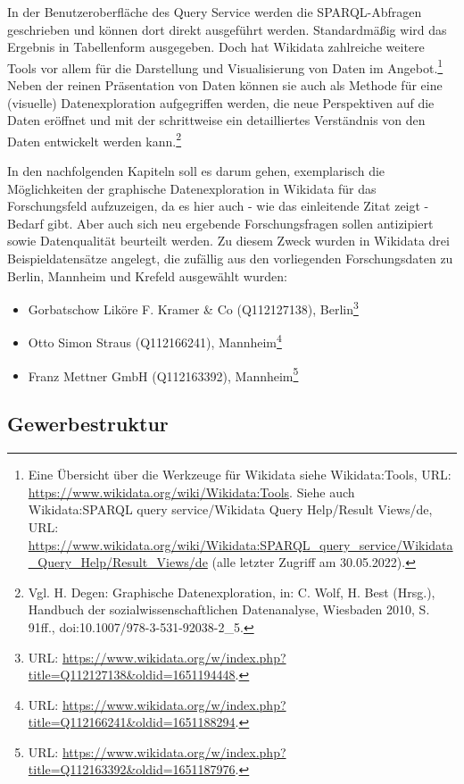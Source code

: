 In der Benutzeroberfläche des Query Service werden die SPARQL-Abfragen geschrieben und können dort direkt ausgeführt werden. Standardmäßig wird das Ergebnis in Tabellenform ausgegeben. Doch hat Wikidata zahlreiche weitere Tools vor allem für die Darstellung und Visualisierung von Daten im Angebot.\footnote{Eine Übersicht über die Werkzeuge für Wikidata siehe Wikidata:Tools, URL: \url{https://www.wikidata.org/wiki/Wikidata:Tools}. Siehe auch Wikidata:SPARQL query service/Wikidata Query Help/Result Views/de, URL: \url{https://www.wikidata.org/wiki/Wikidata:SPARQL_query_service/Wikidata_Query_Help/Result_Views/de} (alle letzter Zugriff am 30.05.2022).} Neben der reinen Präsentation von Daten können sie auch als Methode für eine (visuelle) Datenexploration aufgegriffen werden, die neue Perspektiven auf die Daten eröffnet und mit der schrittweise ein detailliertes Verständnis von den Daten entwickelt werden kann.\footnote{Vgl. H. Degen: Graphische Datenexploration, in: C. Wolf, H. Best (Hrsg.), Handbuch der sozialwissenschaftlichen Datenanalyse, Wiesbaden 2010, S. 91ff., doi:10.1007/978-3-531-92038-2\_5.} 

In den nachfolgenden Kapiteln soll es darum gehen, exemplarisch die Möglichkeiten der graphische Datenexploration in Wikidata für das Forschungsfeld aufzuzeigen, da es hier auch - wie das einleitende Zitat zeigt - Bedarf gibt. Aber auch sich neu ergebende Forschungsfragen sollen antizipiert sowie Datenqualität beurteilt werden. Zu diesem Zweck wurden in Wikidata drei Beispieldatensätze angelegt, die zufällig aus den vorliegenden Forschungsdaten zu Berlin, Mannheim und Krefeld ausgewählt wurden:

\begin{itemize}
    \item Gorbatschow Liköre F. Kramer \& Co (Q112127138), Berlin\footnote{URL: \url{https://www.wikidata.org/w/index.php?title=Q112127138\&oldid=1651194448}.}
    \item Otto Simon Straus (Q112166241), Mannheim\footnote{URL: \url{https://www.wikidata.org/w/index.php?title=Q112166241\&oldid=1651188294}.}
    \item Franz Mettner GmbH (Q112163392), Mannheim\footnote{URL: \url{https://www.wikidata.org/w/index.php?title=Q112163392\&oldid=1651187976}.}
\end{itemize}

\subsection{Gewerbestruktur}

